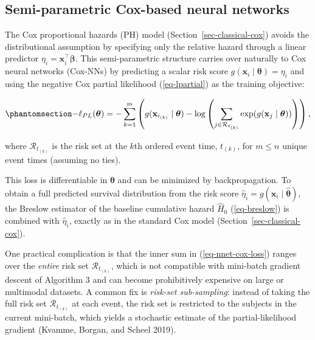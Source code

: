 \documentclass[
  letterpaper,
  krantz2]{style/krantz}
\begin{document}
\subsection{Semi-parametric Cox-based neural
networks}\label{sec-nnet-cox}

The Cox proportional hazards (PH) model
(Section~\ref{sec-classical-cox}) avoids the distributional assumption
by specifying only the relative hazard through a linear predictor
\(\eta_i = \mathbf{x}_i^\top\boldsymbol{\beta}\).
This semi-parametric structure carries over naturally to Cox neural
networks (Cox-NNs) by predicting a scalar risk score
\(g(\mathbf{x}_i \mid \boldsymbol{\theta}) = \eta_i\) and using the
negative Cox partial likelihood (\ref{eq-lpartial}) as the training
objective:

\begin{equation}\phantomsection\label{eq-nnet-cox-loss}{
-\ell_{PL}(\boldsymbol{\theta}) = -\sum_{k=1}^m \left(g(\mathbf{x}_{i_{(k)}} \mid \boldsymbol{\theta}) - \log \left(\sum_{j \in \mathcal{R}_{t_{(k)}}} \exp(g(\mathbf{x}_j \mid \boldsymbol{\theta}))\right)\right),
}\end{equation}

where \(\mathcal{R}_{t_{(k)}}\) is the risk set at the \(k\)th ordered
event time, \(t_{(k)}\), for \(m \leq n\) unique event times (assuming
no ties).

This loss is differentiable in \(\boldsymbol{\theta}\) and can be
minimized by backpropagation. To obtain a full predicted survival
distribution from the risk score
\(\hat{\eta}_i = g(\mathbf{x}_i \mid \hat{\boldsymbol{\theta}})\), the
Breslow estimator of the baseline cumulative hazard \(\hat{H}_0\)
(\ref{eq-breslow}) is combined with \(\hat{\eta}_i\), exactly as in the
standard Cox model (Section~\ref{sec-classical-cox}).

One practical complication is that the inner sum in
(\ref{eq-nnet-cox-loss}) ranges over the \emph{entire} risk set
\(\mathcal{R}_{t_{(k)}}\), which is not compatible with mini-batch
gradient descent of Algorithm 3 and can become prohibitively expensive
on large or multimodal datasets. A common fix is \emph{risk-set
sub-sampling}: instead of taking the full risk set
\(\mathcal{R}_{t_{(k)}}\) at each event, the risk set is restricted to
the subjects in the current mini-batch, which yields a stochastic
estimate of the partial-likelihood gradient (Kvamme, Borgan, and Scheel
2019). 
\end{document}
